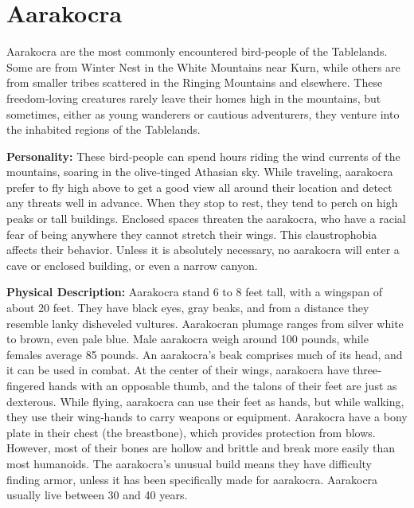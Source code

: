 \section{Aarakocra}

Aarakocra are the most commonly encountered bird-people of the Tablelands. Some are from Winter Nest in the White Mountains near Kurn, while others are from smaller tribes scattered in the Ringing Mountains and elsewhere. These freedom‐loving creatures rarely leave their homes high in the mountains, but sometimes, either as young wanderers or cautious adventurers, they venture into the inhabited regions of the Tablelands.

\textbf{Personality:} These bird‐people can spend hours riding the wind currents of the mountains, soaring in the olive‐tinged Athasian sky. While traveling, aarakocra prefer to fly high above to get a good view all around their location and detect any threats well in advance. When they stop to rest, they tend to perch on high peaks or tall buildings. Enclosed spaces threaten the aarakocra, who have a racial fear of being anywhere they cannot stretch their wings. This claustrophobia affects their behavior. Unless it is absolutely necessary, no aarakocra will enter a cave or enclosed building, or even a narrow canyon.

\textbf{Physical Description:} Aarakocra stand 6 \onehalf to 8 feet tall, with a wingspan of about 20 feet. They have black eyes, gray beaks, and from a distance they resemble lanky disheveled vultures. Aarakocran plumage ranges from silver white to brown, even pale blue. Male aarakocra weigh around 100 pounds, while females average 85 pounds. An aarakocra's beak comprises much of its head, and it can be used in combat. At the center of their wings, aarakocra have three‐fingered hands with an opposable thumb, and the talons of their feet are just as dexterous. While flying, aarakocra can use their feet as hands, but while walking, they use their wing‐hands to carry weapons or equipment. Aarakocra have a bony plate in their chest (the breastbone), which provides protection from blows. However, most of their bones are hollow and brittle and break more easily than most humanoids. The aarakocra's unusual build means they have difficulty finding armor, unless it has been specifically made for aarakocra. Aarakocra usually live between 30 and 40 years.

